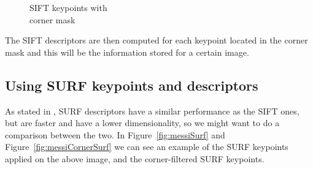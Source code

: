 \begin{figure}[ht!]
\begin{minipage}{.5\textwidth}
	\caption{SIFT keypoints with\\ corner mask}
	\label{fig:messiCornerSift}
\end{minipage}
\end{figure}

The SIFT descriptors are then computed for each keypoint located in the corner mask and this will be the information stored for a certain image.

\subsection{Using SURF keypoints and descriptors}

As stated in , SURF descriptors have a similar performance as the SIFT ones, but are faster and have a lower dimensionality, so we might want to do a comparison between the two.
In Figure~\ref{fig:messiSurf} and Figure~\ref{fig:messiCornerSurf} we can see an example of the SURF keypoints applied on the above image, and the corner-filtered SURF keypoints.

